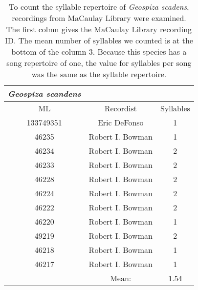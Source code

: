 \documentclass[a4paper,12pt]{article}
\begin{document}
\begin{table}[ht]
\caption{To count the syllable repertoire of \textit{Geospiza scadens}, recordings from MaCaulay Library were examined. The first colmn gives the MaCaulay Library recording ID. The mean number of syllables we counted is at the bottom of the column 3. Because this species has a song repertoire of one, the value for syllables per song was the same as the syllable repertoire.}
\centering
\begin{tabular}{ccc}
  \hline
\textit{Geospiza scandens} &  &  \\ 
  \hline \hline
ML & Recordist & Syllables \\ \hline
  133749351 & Eric DeFonso  & 1 \\ 
  46235 & Robert I. Bowman & 1 \\ 
  46234 & Robert I. Bowman & 2 \\ 
  46233 & Robert I. Bowman & 2 \\ 
  46228 & Robert I. Bowman & 2 \\ 
  46224 & Robert I. Bowman & 2 \\ 
  46222 & Robert I. Bowman & 2 \\ 
  46220 & Robert I. Bowman & 1 \\ 
  49219 & Robert I. Bowman & 2 \\ 
  46218 & Robert I. Bowman & 1 \\ 
  46217 & Robert I. Bowman & 1 \\ \hline
   & Mean: & 1.54 \\ 
   \hline
\end{tabular}
\end{table}
\end{document}
